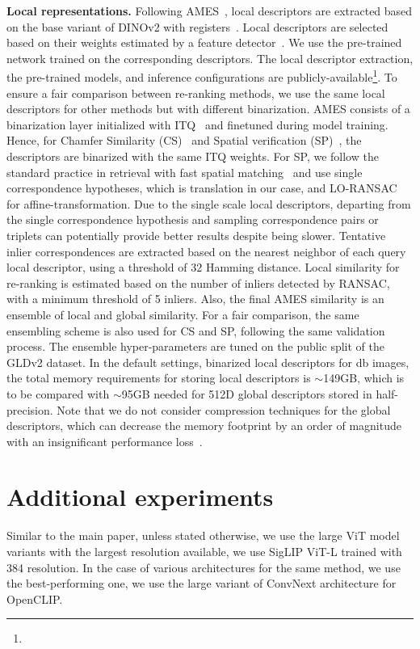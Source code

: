 \noindent\textbf{Local representations.}
Following AMES~\cite{ski+24}, local descriptors are extracted based on the base variant of DINOv2 with registers~\cite{odm+24,doj+23}. Local descriptors are selected based on their weights estimated by a feature detector~\cite{cas20}. We use the pre-trained network trained on the corresponding descriptors. The local descriptor extraction, the pre-trained models, and inference configurations are publicly-available\footnote{}. To ensure a fair comparison between re-ranking methods, we use the same local descriptors for other methods but with  different binarization. AMES consists of a binarization layer initialized with ITQ~\cite{glg+12,ktp+22} and finetuned during model training. Hence, for Chamfer Similarity (CS)~\cite{rsa+14} and Spatial verification (SP)~\cite{pci+07}, the descriptors are binarized with the same ITQ weights.
For SP, we follow the standard practice in retrieval with fast spatial matching~\cite{cas20} and use single correspondence hypotheses, which is translation in our case, and LO-RANSAC~\cite{cmk03} for affine-transformation. Due to the single scale local descriptors, departing from the single correspondence hypothesis and sampling correspondence pairs or triplets can potentially provide better results despite being slower.
Tentative inlier correspondences are extracted based on the nearest neighbor of each query local descriptor, using a threshold of 32 Hamming distance. Local similarity for re-ranking is estimated based on the number of inliers detected by RANSAC, with a minimum threshold of 5 inliers.
Also, the final AMES similarity is an ensemble of local and global similarity. For a fair comparison, the same ensembling scheme is also used for CS and SP, following the same validation process. The ensemble hyper-parameters are tuned on the public split of the GLDv2 dataset.
In the default settings,  binarized local descriptors for db images, the total memory requirements for storing local descriptors is $\sim$149GB, which is to be compared with $\sim$95GB needed for 512D global descriptors stored in half-precision.
Note that we do not consider compression techniques for the global descriptors, which can decrease the memory footprint by an order of magnitude with an insignificant performance loss~\cite{gar+17, ski+24}.

\section{Additional experiments}
Similar to the main paper, unless stated otherwise, we use the large ViT model variants with the largest resolution available, \eg we use SigLIP ViT-L trained with 384 resolution. In the case of various architectures for the same method, we use the best-performing one, \eg we use the large variant of ConvNext architecture for OpenCLIP.

